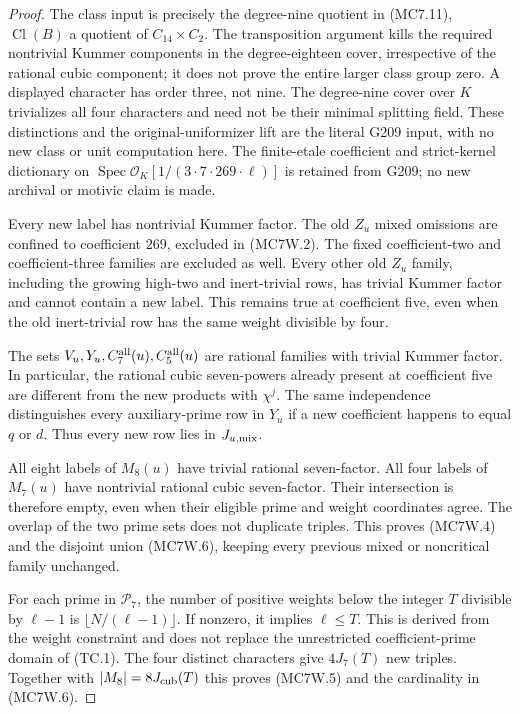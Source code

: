 \begin{proof}
The class input is precisely the degree-nine quotient in
(MC7.11), $\operatorname{Cl}(B)$ a quotient of $C_{14}\times C_2$.
The transposition argument kills the required nontrivial Kummer
components in the degree-eighteen cover, irrespective of the
rational cubic component; it does not prove the entire larger
class group zero. A displayed character has order three,
not nine. The degree-nine cover over $K$ trivializes all four
characters and need not be their minimal splitting field.
These distinctions and the original-uniformizer lift are the
literal G209 input, with no new class or unit computation here.
The finite-etale coefficient and strict-kernel dictionary on
$\operatorname{Spec}\mathcal O_K[1/(3\cdot7\cdot269\cdot\ell)]$
is retained from G209; no new archival or motivic claim is made.

Every new label has nontrivial Kummer factor. The old $Z_u$
mixed omissions are confined to coefficient $269$, excluded
in (MC7W.2). The fixed coefficient-two and coefficient-three
families are excluded as well. Every other old $Z_u$ family,
including the growing high-two and inert-trivial rows, has
trivial Kummer factor and cannot contain a new label.
This remains true at coefficient five, even when the old
inert-trivial row has the same weight divisible by four.

The sets $V_u,Y_u,C_7^{\rm all}(u),C_5^{\rm all}(u)$ are
rational families with trivial Kummer factor. In particular,
the rational cubic seven-powers already present at coefficient
five are different from the new products with $\chi^j$.
The same independence distinguishes every auxiliary-prime row
in $Y_u$ if a new coefficient happens to equal $q$ or $d$.
Thus every new row lies in $J_{u,\rm mix}$.

All eight labels of $M_8(u)$ have trivial rational seven-factor.
All four labels of $M_7(u)$ have nontrivial rational cubic
seven-factor. Their intersection is therefore empty, even
when their eligible prime and weight coordinates agree.
The overlap of the two prime sets does not duplicate triples.
This proves (MC7W.4) and the disjoint union (MC7W.6), keeping
every previous mixed or noncritical family unchanged.

For each prime in $\mathscr P_7$, the number of positive
weights below the integer $T$ divisible by $\ell-1$ is
$\lfloor N/(\ell-1)\rfloor$. If nonzero, it implies $\ell\leq T$.
This is derived from the weight constraint and does not replace
the unrestricted coefficient-prime domain of (TC.1).
The four distinct characters give $4J_7(T)$ new triples.
Together with $|M_8|=8J_{\rm cub}(T)$ this proves (MC7W.5)
and the cardinality in (MC7W.6).


\end{proof}
